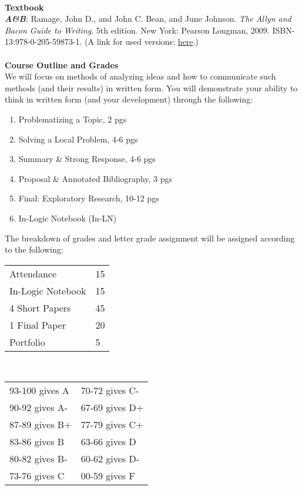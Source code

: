 \documentclass [11pt]{article}
\begin{document}
   \ \\

   {\bf Textbook}\\
{\bf {\sl A\&B}}: Ramage, John D., and John C. Bean, and June Johnson. {\sl The Allyn and Bacon Guide to Writing}. 5th edition. New York: Pearson Longman, 2009. ISBN-13:978-0-205-59873-1. (A link for used versions:  \href{http://www.amazon.com/Allyn-Bacon-Guide-Writing-MyCompLab/dp/0205598730/ref=sr_1_3/175-1452668-8158623?ie=UTF8&s=books&qid=1245772101&sr=1-3}{here}.) \\
   \ \\

   
   {\bf Course Outline and Grades}\\
   We will focus on methods of analyzing ideas and how to communicate such methods (and their results) in written form. You will demonstrate your ability to think in written form (and your development) through the following:
   \begin{enumerate}
     \item Problematizing a Topic, 2 pgs
     \item Solving a Local Problem, 4-6 pgs
     \item Summary \& Strong Response, 4-6 pgs
     \item Proposal \& Annotated Bibliography, 3 pgs
     \item Final: Exploratory Research, 10-12 pgs
     \item In-Logic Notebook (In-LN)
   \end{enumerate}

The breakdown of grades and letter grade assignment will be assigned according to the following:
\vskip 2mm
  
\begin{tabular}{|l|l|}
\hline
Attendance & 15\\
In-Logic Notebook & 15\\
4 Short Papers & 45\\
1 Final Paper & 20\\
Portfolio & 5\\
\hline
\end{tabular} \  \  \  \  \ \begin{tabular}{|l|l|}
   \hline
   93-100 gives A & 70-72 gives C-\\
   90-92 gives A- & 67-69 gives D+\\
   87-89 gives B+ & 77-79 gives C+\\
   83-86 gives B & 63-66 gives D\\
   80-82 gives B- & 60-62 gives D-\\
   73-76 gives C & 00-59 gives F\\
   \hline 
   \end{tabular}
   \ \\
\end{document}
